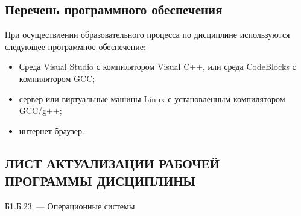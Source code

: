 \documentclass[a4paper,12pt]{article}
\begin{document}
\subsection{Перечень программного обеспечения}
При осуществлении образовательного процесса по дисциплине используются следующее программное обеспечение:
\begin{itemize}[nolistsep]
  
\item Среда Visual Studio с компилятором Visual C++, или среда CodeBlocks с компилятором GCC;
  
\item сервер или виртуальные машины Linux с установленным компилятором GCC/g++;
  
\item интернет-браузер.
  
\end{itemize}



\newpage
\begin{center}
\section*{ЛИСТ АКТУАЛИЗАЦИИ РАБОЧЕЙ ПРОГРАММЫ ДИСЦИПЛИНЫ}
Б1.Б.23\ --- Операционные системы 
\end{center}
\end{document}

